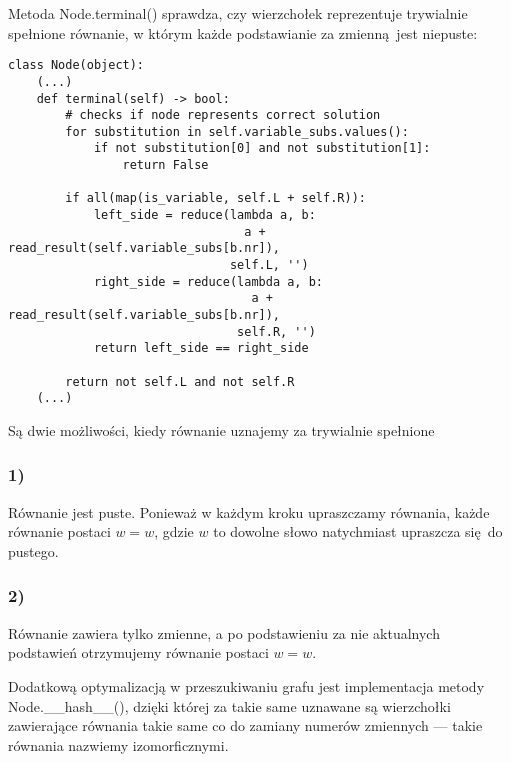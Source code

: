 \documentclass[leqno, 12pt]{article}
\begin{document}
Metoda Node.terminal() sprawdza, czy wierzchołek reprezentuje trywialnie spełnione równanie, w którym każde podstawianie za zmienną jest niepuste:

\begin{verbatim}
class Node(object):
    (...)
    def terminal(self) -> bool:
        # checks if node represents correct solution
        for substitution in self.variable_subs.values():
            if not substitution[0] and not substitution[1]:
                return False

        if all(map(is_variable, self.L + self.R)):
            left_side = reduce(lambda a, b:
                                 a + read_result(self.variable_subs[b.nr]),
                               self.L, '')
            right_side = reduce(lambda a, b:
                                  a + read_result(self.variable_subs[b.nr]),
                                self.R, '')
            return left_side == right_side

        return not self.L and not self.R
    (...)
\end{verbatim}

Są dwie możliwości, kiedy równanie uznajemy za trywialnie spełnione
\subsubsection*{1)}
Równanie jest puste. Ponieważ w każdym kroku upraszczamy równania, każde równanie postaci $w=w$, gdzie $w$ to dowolne słowo natychmiast upraszcza się do pustego.

\subsubsection*{2)}
Równanie zawiera tylko zmienne, a po podstawieniu za nie aktualnych podstawień otrzymujemy równanie postaci $w=w$. \newline\newline

Dodatkową optymalizacją w przeszukiwaniu grafu jest implementacja metody Node.\_\_hash\_\_(), dzięki której za takie same uznawane są wierzchołki zawierające równania takie same co do zamiany numerów zmiennych --- takie równania nazwiemy izomorficznymi.
\end{document}
